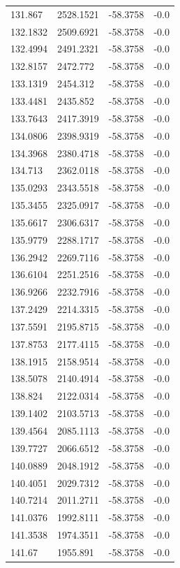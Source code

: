 \begin{table}[H]
\begin{tabular}{llll}
131.867 & 2528.1521 & -58.3758 & -0.0 \\
132.1832 & 2509.6921 & -58.3758 & -0.0 \\
132.4994 & 2491.2321 & -58.3758 & -0.0 \\
132.8157 & 2472.772 & -58.3758 & -0.0 \\
133.1319 & 2454.312 & -58.3758 & -0.0 \\
133.4481 & 2435.852 & -58.3758 & -0.0 \\
133.7643 & 2417.3919 & -58.3758 & -0.0 \\
134.0806 & 2398.9319 & -58.3758 & -0.0 \\
134.3968 & 2380.4718 & -58.3758 & -0.0 \\
134.713 & 2362.0118 & -58.3758 & -0.0 \\
135.0293 & 2343.5518 & -58.3758 & -0.0 \\
135.3455 & 2325.0917 & -58.3758 & -0.0 \\
135.6617 & 2306.6317 & -58.3758 & -0.0 \\
135.9779 & 2288.1717 & -58.3758 & -0.0 \\
136.2942 & 2269.7116 & -58.3758 & -0.0 \\
136.6104 & 2251.2516 & -58.3758 & -0.0 \\
136.9266 & 2232.7916 & -58.3758 & -0.0 \\
137.2429 & 2214.3315 & -58.3758 & -0.0 \\
137.5591 & 2195.8715 & -58.3758 & -0.0 \\
137.8753 & 2177.4115 & -58.3758 & -0.0 \\
138.1915 & 2158.9514 & -58.3758 & -0.0 \\
138.5078 & 2140.4914 & -58.3758 & -0.0 \\
138.824 & 2122.0314 & -58.3758 & -0.0 \\
139.1402 & 2103.5713 & -58.3758 & -0.0 \\
139.4564 & 2085.1113 & -58.3758 & -0.0 \\
139.7727 & 2066.6512 & -58.3758 & -0.0 \\
140.0889 & 2048.1912 & -58.3758 & -0.0 \\
140.4051 & 2029.7312 & -58.3758 & -0.0 \\
140.7214 & 2011.2711 & -58.3758 & -0.0 \\
141.0376 & 1992.8111 & -58.3758 & -0.0 \\
141.3538 & 1974.3511 & -58.3758 & -0.0 \\
141.67 & 1955.891 & -58.3758 & -0.0 \\

\end{tabular}
\end{table}
